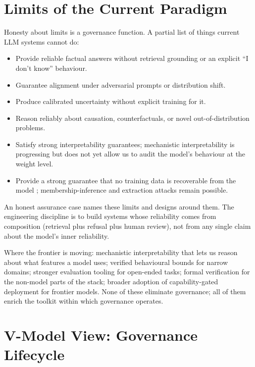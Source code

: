 \section{Limits of the Current Paradigm}

Honesty about limits is a governance function. A partial list
of things current LLM systems cannot do:

\begin{itemize}
  \item Provide reliable factual answers without retrieval
        grounding or an explicit ``I don't know'' behaviour.
  \item Guarantee alignment under adversarial prompts or
        distribution shift.
  \item Produce calibrated uncertainty without explicit training
        for it.
  \item Reason reliably about causation, counterfactuals, or
        novel out-of-distribution problems.
  \item Satisfy strong interpretability guarantees; mechanistic
        interpretability is progressing but does not yet allow
        us to audit the model's behaviour at the weight level.
  \item Provide a strong guarantee that no training data is
        recoverable from the model
        \citep{weidinger2021ethical}; membership-inference and
        extraction attacks remain possible.
\end{itemize}

An honest assurance case names these limits and designs around
them. The engineering discipline is to build systems whose
reliability comes from composition (retrieval plus refusal plus
human review), not from any single claim about the model's
inner reliability.

Where the frontier is moving: mechanistic interpretability that
lets us reason about what features a model uses; verified
behavioural bounds for narrow domains; stronger evaluation
tooling for open-ended tasks; formal verification for the
non-model parts of the stack; broader adoption of
capability-gated deployment for frontier models. None of these
eliminate governance; all of them enrich the toolkit within which
governance operates.

\section{V-Model View: Governance Lifecycle}

